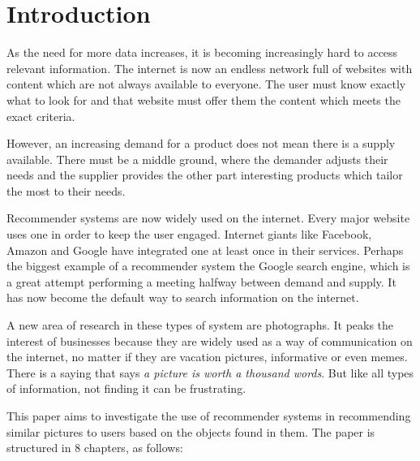 \chapter*{Introduction}

As the need for more data increases, it is becoming increasingly hard to access relevant information. The internet is now an endless network full of websites with content which are not always available to everyone. The user must know exactly what to look for and that website must offer them the content which meets the exact criteria.

However, an increasing demand for a product does not mean there is a supply available. There must be a middle ground, where the demander adjusts their needs and the supplier provides the other part interesting products which tailor the most to their needs.

Recommender systems are now widely used on the internet. Every major website uses one in order to keep the user engaged. Internet giants like Facebook, Amazon and Google have integrated one at least once in their services. Perhaps the biggest example of a recommender system the Google search engine, which is a great attempt performing a meeting halfway between demand and supply. It has now become the default way to search information on the internet.

A new area of research in these types of system are photographs. It peaks the interest of businesses because they are widely used as a way of communication on the internet, no matter if they are vacation pictures, informative or even memes. There is a saying that says \textit{a picture is worth a thousand words}. But like all types of information, not finding it can be frustrating.

This paper aims to investigate the use of recommender systems in recommending similar pictures to users based on the objects found in them. The paper is structured in 8 chapters, as follows:

